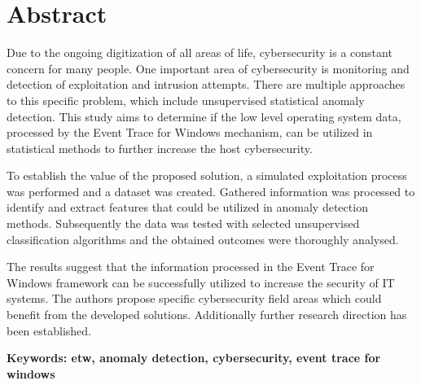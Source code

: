 \documentclass[a4paper,twoside,12pt]{book}
\newcounter{PagesWithoutNumbers}
\begin{document}
\pagestyle{onlyPageNumbers}
\tableofcontents

\setcounter{PagesWithoutNumbers}{\value{page}}
\mainmatter

\pagestyle{empty}

\chapter*{Abstract}


Due to the ongoing digitization of all areas of life, cybersecurity is a constant concern for many people. One important area of cybersecurity 
is monitoring and detection of exploitation and intrusion attempts. There are multiple approaches to this specific problem, which include 
unsupervised statistical anomaly detection. This study aims to determine if the low level operating system data, processed by the Event 
Trace for Windows mechanism, can be utilized in statistical methods to further increase the host cybersecurity.

To establish the value of the proposed solution, a simulated exploitation process was performed and a dataset was created. Gathered 
information was processed to identify and extract features that could be utilized in anomaly detection methods. Subsequently the 
data was tested with selected unsupervised classification algorithms and the obtained outcomes were thoroughly analysed.

The results suggest that the information processed in the Event Trace for Windows framework can be successfully utilized to increase the 
security of IT systems. The authors propose specific cybersecurity field areas which could benefit from the developed solutions. 
Additionally further research direction has been established.


\bf{Keywords:} etw, anomaly detection, cybersecurity, event trace for windows 


\cleardoublepage



\pagestyle{PageNumbersChapterTitles}

\end{document}
